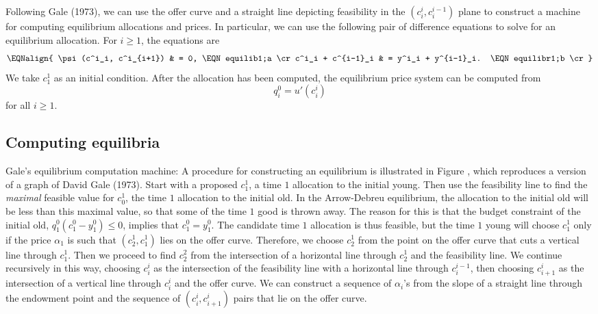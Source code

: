 \medskip {}%
Following Gale (1973),
 we can use the offer curve and
a straight line depicting feasibility in the $(c^i_i, c^{i-1}_i)$ plane
to construct a machine for computing equilibrium allocations and prices.
In particular, we  can use the following pair of difference equations to
solve for an equilibrium allocation.  For $i \geq 1$, the equations
are
$$\EQNalign{  \psi(c^i_i, c^i_{i+1}) & = 0, \EQN equilib1;a \cr
              c^i_i + c^{i-1}_i & = y^i_i + y^{i-1}_i. \EQN equilibr1;b \cr}$$
We take $c_1^1$ as an initial condition.
After the allocation has been computed, the equilibrium price
system can be computed
from
$$ q^0_i = u'(c^i_i) $$
for all $i \geq 1$.


\subsection{Computing equilibria}


 \quad Gale's equilibrium computation machine:
A procedure for constructing an equilibrium is illustrated
in Figure , %
which reproduces a version of a graph
of David Gale (1973).
  Start with
a proposed $c_1^1$, a time $1$ allocation to the initial young.
Then use the feasibility line to  find the {\it maximal\/}
feasible value for $c_0^1$, the time $1$  allocation to    the
initial old.  In the Arrow-Debreu equilibrium, the allocation to
the initial old will be less than this maximal value, so that some
of the time $1$ good is thrown away.  The reason for this is that
 the budget constraint of the initial old, $q_1^0( c^0_1 - y^0_1) \leq 0$, implies
that $c^0_1 = y^0_1$.
The candidate time $1$  allocation is thus feasible, but  the
time $1$  young will choose $c_1^1$ only if the price $\alpha_1$ is such that
$(c_2^1, c_1^1)$ lies
on the offer curve.      Therefore, we choose $c_2^1$ from
the point on the offer curve that cuts a vertical
line through  $c_1^1$.   Then we proceed to find $c_2^2$ from
the intersection of a horizontal line through $c_2^1$
and the  feasibility line.   We continue recursively in this way,
choosing $c_i^i$ as the intersection of the feasibility line
with a horizontal line through $c^{i-1}_i$, then
choosing $c_{i+1}^i$ as the intersection of a vertical
line through $c_i^i$   and the offer curve.    We can
construct a sequence of $\alpha_i$'s from the slope
of a straight line through the endowment point
and the sequence of $(c_i^i, c^i_{i+1})$  pairs that
lie on the offer curve.

